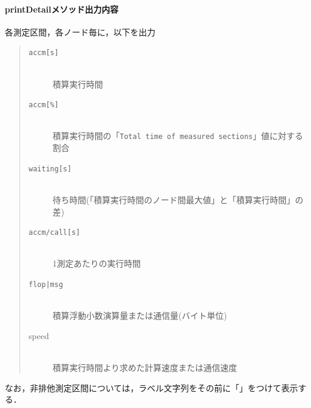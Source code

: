 \paragraph{printDetailメソッド出力内容}
各測定区間，各ノード毎に，以下を出力
\begin{quote}
\begin{description}
\item[{\tt accm[s]}]\mbox{}\\
積算実行時間
\item[{\tt accm[\%]}]\mbox{}\\
積算実行時間の「{\tt Total time of measured sections}」値に対する割合
\item[{\tt waiting[s]}]\mbox{}\\
待ち時間(「積算実行時間のノード間最大値」と「積算実行時間」の差)
\item[{\tt accm/call[s]}]\mbox{}\\
1測定あたりの実行時間
\item[{\tt flop|msg}]\mbox{}\\
積算浮動小数演算量または通信量(バイト単位)
\item[speed]\mbox{}\\
積算実行時間より求めた計算速度または通信速度
\end{description}
\end{quote}

なお，非排他測定区間については，ラベル文字列をその前に「{\tt *}」をつけて表示する．







